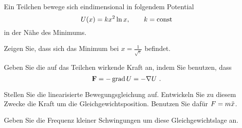 \begin{atiTask}[
  title = Linearisierte Schwingungen
]
  Ein Teilchen bewege sich eindimensional in folgendem Potential
  \[
    U(x) = kx^2\ln x
    ,\qquad
    k = \text{const}
  \]
  in der Nähe des Minimums.
  \begin{atiSubtasks}
    \item{
      Zeigen Sie, dass sich das Minimum bei $x=\frac{1}{\sqrt{e}}$ befindet.
    }
    \item{
      Geben Sie die auf das Teilchen wirkende Kraft an, indem Sie benutzen, dass
      \[
        \mathbf{F} = -\operatorname{grad} U = -\nabla U \ .
      \]
    }
    \item{
      Stellen Sie die linearisierte Bewegungsgleichung auf.
      Entwickeln Sie zu diesem Zwecke die Kraft um die Gleichgewichtsposition.
      Benutzen Sie dafür $F = m\ddot{x}$.
    }
    \item{
      Geben Sie die Frequenz kleiner Schwingungen um diese Gleichgewichtslage an.
    }
  \end{atiSubtasks}
\end{atiTask}
